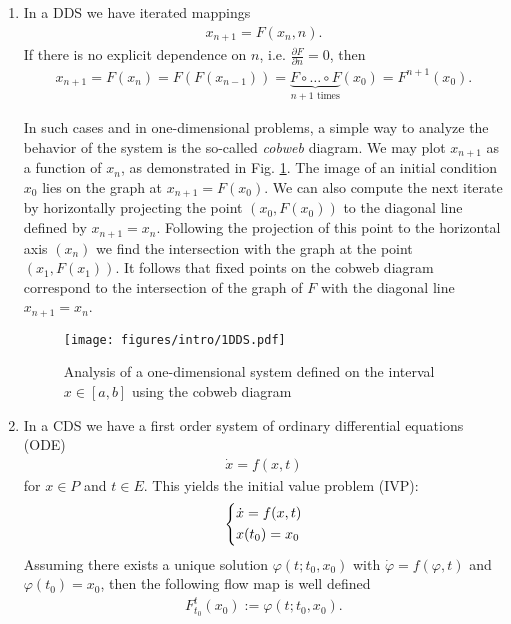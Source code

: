 \begin{enumerate}
	\item In a DDS we have iterated mappings 
	\begin{align}
		\boxed{ {x}_{n+1} = F( {x}_n , n).}	
	\end{align}
	If there is no explicit dependence on $n$, i.e. $\frac{\partial F}{\partial n} = 0$, then 
	\begin{align}
		\boxed{  {x}_{n+1}=F( {x}_n) = F(F( {x}_{n-1})) = \underbrace{F \circ \ldots \circ F}_{n+1 \textrm{ times} }( {x}_0) = F^{n+1}( {x}_0).}
	\end{align}
	

\begin{ex}
	In such cases and in one-dimensional problems, a simple way to analyze the behavior of the system is the so-called \textit{cobweb} diagram. We may plot $x_{n+1}$ as a function of $x_{n}$, as demonstrated in Fig. \ref{fig:cobweb}. The image of an initial condition $x_0$ lies on the graph at $x_{n+1}=F(x_0)$. We can also compute the next iterate by horizontally projecting the point $(x_0, F(x_0))$ to the diagonal line defined by $x_{n+1}= x_n$. Following the projection of this point to the horizontal axis $(x_n)$ we find the intersection with the graph at the point $(x_1, F(x_1))$. It follows that fixed points on the cobweb diagram correspond to the intersection of the graph of $F$ with the diagonal line $x_{n+1}= x_n$.
	\begin{figure}[h!]
	\centering
	\texttt{[image: figures/intro/1DDS.pdf]}
	\caption{Analysis of a one-dimensional system defined on the interval $x\in [a,b]$ using the cobweb diagram} \label{fig:cobweb}
\end{figure}
\end{ex}

\item In a CDS we have a first order system of ordinary differential equations (ODE)
	\begin{align}
		\boxed{
			\dot{ {x}} = f( {x},t)
		}
	\end{align}
	for $ {x}\in P$ and $t \in E$. This yields the initial value problem (IVP):
	\begin{align}
		\begin{dcases}
			\dot{ {x}} = f( {x},t) \\
			 {x}(t_0) =  {x}_0
		\end{dcases}
	\end{align}
	Assuming there exists a unique solution $\varphi(t; t_0,  {x}_0)$ with $\dot{\varphi} = f(\varphi,t)$ and $\varphi(t_0)=  {x}_0$, then the following flow map is well defined
	\begin{align}
		\boxed{
		F_{t_0}^{t}( {x}_0) := \varphi(t; t_0,  {x}_0).}
	\end{align}


\end{enumerate}
